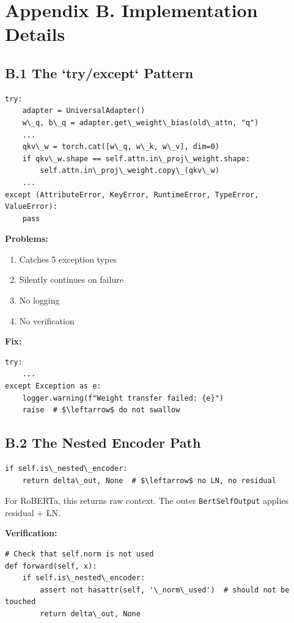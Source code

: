 
\section{Appendix B. Implementation Details}

\subsection{B.1 The `try/except` Pattern}

\begin{lstlisting}
try:
    adapter = UniversalAdapter()
    w\_q, b\_q = adapter.get\_weight\_bias(old\_attn, "q")
    ...
    qkv\_w = torch.cat([w\_q, w\_k, w\_v], dim=0)
    if qkv\_w.shape == self.attn.in\_proj\_weight.shape:
        self.attn.in\_proj\_weight.copy\_(qkv\_w)
    ...
except (AttributeError, KeyError, RuntimeError, TypeError, ValueError):
    pass
\end{lstlisting}

\textbf{Problems:}
\begin{enumerate}
\item Catches 5 exception types
\item Silently continues on failure
\item No logging
\item No verification

\end{enumerate}
\textbf{Fix:}

\begin{lstlisting}
try:
    ...
except Exception as e:
    logger.warning(f"Weight transfer failed: {e}")
    raise  # $\leftarrow$ do not swallow
\end{lstlisting}

\subsection{B.2 The Nested Encoder Path}

\begin{lstlisting}
if self.is\_nested\_encoder:
    return delta\_out, None  # $\leftarrow$ no LN, no residual
\end{lstlisting}

For RoBERTa, this returns raw context. The outer \texttt{BertSelfOutput} applies 
residual + LN.

\textbf{Verification:}

\begin{lstlisting}
# Check that self.norm is not used
def forward(self, x):
    if self.is\_nested\_encoder:
        assert not hasattr(self, '\_norm\_used')  # should not be touched
        return delta\_out, None
\end{lstlisting}


